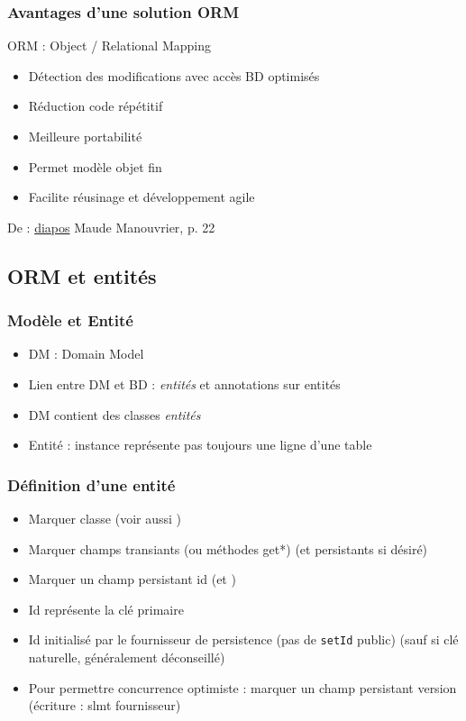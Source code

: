 \documentclass[english, french]{beamer}
\begin{document}
\begin{frame}
	\frametitle{Avantages d’une solution ORM}
	ORM : Object / Relational Mapping
	\begin{itemize}
		\item Détection des modifications avec accès BD optimisés
		\item Réduction code répétitif
		\item Meilleure portabilité
		\item Permet modèle objet fin
		\item Facilite réusinage et développement agile
	\end{itemize}
	{\tiny De : \href{http://www.lamsade.dauphine.fr/~manouvri/HIBERNATE/SLIDES/ORM.pdf}{diapos} Maude Manouvrier, p. 22}
\end{frame}

\subsection{ORM et entités}
\begin{frame}
	\frametitle{Modèle et Entité}
	\begin{itemize}
		\item DM : Domain Model
		\item Lien entre DM et BD : \emph{entités} et annotations sur entités
		\item DM contient des classes \emph{entités}
		\item Entité : instance représente {\tiny pas toujours} une ligne d’une table
	\end{itemize}
\end{frame}

\begin{frame}
	\frametitle{Définition d’une entité}
	\begin{itemize}
		\item Marquer classe  {\tiny (voir aussi )}
		\item Marquer champs transiants {\tiny (ou méthodes get*)}  {\tiny (et persistants  si désiré)}
		\item Marquer un champ persistant id  (et )
		\item Id représente la clé primaire
		\item Id initialisé par le fournisseur de persistence (pas de \texttt{setId} public) {\tiny (sauf si clé naturelle, généralement déconseillé)}
		\item Pour permettre concurrence optimiste : marquer un champ persistant version  (écriture : slmt fournisseur)
	\end{itemize}
\end{frame}
\end{document}
